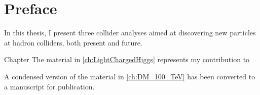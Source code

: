 \chapter*{Preface}

In this thesis, I present three collider analyses aimed at discovering new particles at hadron colliders, both present and future.

Chapter
The material in \autoref{ch:LightChargedHiggs} represents my contribution to 

A condensed version of the material in \autoref{ch:DM_100_TeV} has been converted to a manuscript for publication. 

